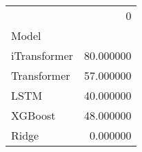 \begin{tabular}{lr}
\toprule
 & 0 \\
Model &  \\
\midrule
iTransformer & 80.000000 \\
Transformer & 57.000000 \\
LSTM & 40.000000 \\
XGBoost & 48.000000 \\
Ridge & 0.000000 \\
\bottomrule
\end{tabular}
